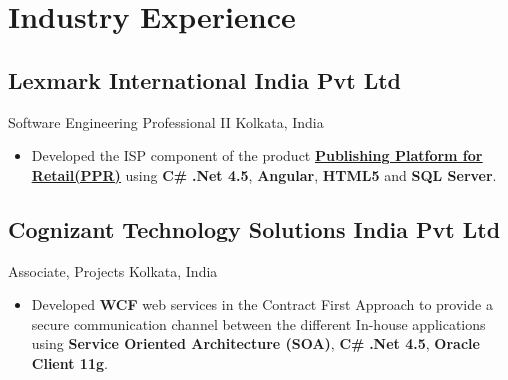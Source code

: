\documentclass[11pt,letter,sans]{moderncv}
\begin{document}
\section{ Industry Experience }

    \subsection{Lexmark International India Pvt Ltd}
      {}%
      {Software Engineering Professional II}%
      {Kolkata, India}%
      {}%
      {}
      {
        \begin{itemize}
        
        \item Developed the ISP component of the product \href{https://infoserve.lexmark.com/ids/idv/video.aspx?category=All&productCode=PUBLISHING_PLATFORM_FOR_RETAIL&topic=v54408848&vId=PPR%2fLexmark-PPR-ISP-Overview-video&ar=16%3a9&l1=1&l2=1&sh=969&sw=1920&loc=en_US}
        {\textbf{\underline{Publishing Platform for Retail(PPR)}}} using {\bf C\#} {\bf .Net 4.5}, {\bf Angular}, {\bf HTML5} and {\bf SQL Server}.
        \end{itemize}
      }
    
  
    \subsection{Cognizant Technology Solutions India Pvt Ltd}
      {}%
      {Associate, Projects}%
      {Kolkata, India}%
      {}%
      {}
      {
        \begin{itemize}
        \item Developed \textbf{WCF} web services in the Contract First Approach to provide a secure communication channel between the different In-house applications using \textbf{Service Oriented Architecture (SOA)}, \textbf{C\#} \textbf{.Net 4.5}, \textbf{Oracle Client 11g}.
        \end{itemize}
      }
  
\end{document}
